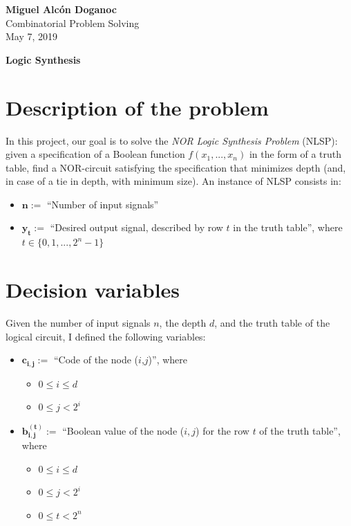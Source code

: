 \documentclass[letterpaper,10pt]{article}
\begin{document}
\noindent
\begin{flushright}
    \large\textbf{Miguel Alcón Doganoc} \\
    Combinatorial Problem Solving \\
    May 7, 2019
\end{flushright}

\newcommand{\code}[1]{\texttt{#1}}

\noindent
{\huge{\textbf{Logic Synthesis}}}

\section{Description of the problem}
In this project, our goal is to solve the \textit{NOR Logic Synthesis Problem}
(NLSP): given a specification of a Boolean function $f(x_1,...,x_n)$ in the form of a truth table, find a NOR-circuit satisfying the specification that minimizes depth (and, in case of a tie in depth, with minimum size). An instance of NLSP consists in:
\begin{itemize}
    \item $\mathbf{n} := $ ``Number of input signals''
    \item $\mathbf{y_t} := $ ``Desired output signal, described by row $t$ in the truth table'', where $t \in \{0,1,...,2^n-1\}$  
\end{itemize}

\section{Decision variables}
Given the number of input signals $n$, the depth $d$, and the truth table of the logical circuit, I defined the following variables:
\begin{itemize}
    \item $\mathbf{c_{i,j}}:=$ ``Code of the node ($i$,$j$)'', where
    \begin{itemize}
        \item $0 \leq i \leq d$
        \item $0 \leq j < 2^i$
    \end{itemize}
    \item $\mathbf{b_{i,j}^{(t)}}:=$ ``Boolean value of the node ($i,j$) for the row $t$ of the truth table'', where
    \begin{itemize}
        \item $0 \leq i \leq d$
        \item $0 \leq j < 2^i$
        \item $0 \leq t < 2^n$
    \end{itemize}
\end{itemize}
\end{document}
